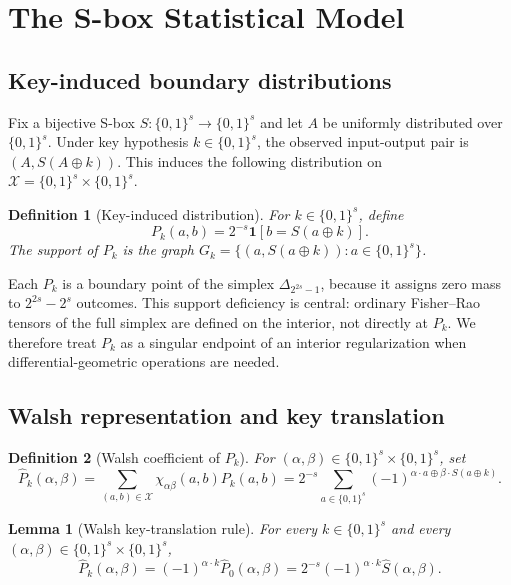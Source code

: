 \documentclass[referee,lineno,pdflatex,sn-mathphys-num]{sn-jnl}
\theoremstyle{thmstylethree}
\newtheorem{definition}{Definition}[section]
\theoremstyle{thmstyletwo}
\theoremstyle{thmstyleone}
\newtheorem{lemma}{Lemma}[section]
\newcommand{\B}[1]{\{0,1\}^{#1}}
\begin{document}
\section{The S-box Statistical Model}\label{sec:manifold}

\subsection{Key-induced boundary distributions}

Fix a bijective S-box $S:\B{s}\to\B{s}$ and let $A$ be uniformly distributed
over $\B{s}$.  Under key hypothesis $k\in\B{s}$, the observed input-output pair
is $(A,S(A\oplus k))$.  This induces the following distribution on
$\mathcal X=\B{s}\times\B{s}$.

\begin{definition}[Key-induced distribution]\label{def:key-dist}
For $k\in\B{s}$, define
\begin{equation}\label{eq:pk}
  P_k(a,b)=2^{-s}\mathbf 1[b=S(a\oplus k)].
\end{equation}
The support of $P_k$ is the graph
$G_k=\{(a,S(a\oplus k)):a\in\B{s}\}$.
\end{definition}

Each $P_k$ is a boundary point of the simplex $\Delta_{2^{2s}-1}$, because it
assigns zero mass to $2^{2s}-2^s$ outcomes.  This support deficiency is central:
ordinary Fisher--Rao tensors of the full simplex are defined on the interior,
not directly at $P_k$.  We therefore treat $P_k$ as a singular endpoint of an
interior regularization when differential-geometric operations are needed.

\subsection{Walsh representation and key translation}

\begin{definition}[Walsh coefficient of $P_k$]\label{def:wht-pk}
For $(\alpha,\beta)\in\B{s}\times\B{s}$, set
\begin{equation}\label{eq:wht-pk}
  \widehat P_k(\alpha,\beta)
  =\sum_{(a,b)\in\mathcal X}\chi_{\alpha\beta}(a,b)P_k(a,b)
  =2^{-s}\sum_{a\in\B{s}}(-1)^{\alpha\cdot a\oplus\beta\cdot S(a\oplus k)}.
\end{equation}
\end{definition}

\begin{lemma}[Walsh key-translation rule]\label{thm:phase-shift}
For every $k\in\B{s}$ and every $(\alpha,\beta)\in\B{s}\times\B{s}$,
\begin{equation}\label{eq:phase-shift}
  \widehat P_k(\alpha,\beta)
  =(-1)^{\alpha\cdot k}\widehat P_0(\alpha,\beta)
  =2^{-s}(-1)^{\alpha\cdot k}\widehat S(\alpha,\beta).
\end{equation}
\end{lemma}
\end{document}
